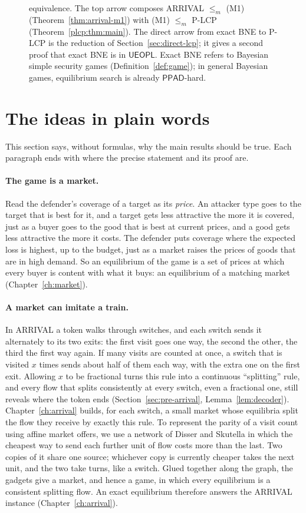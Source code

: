 \begin{figure}[t]
{equivalence. The top arrow composes ARRIVAL $\le_m$ (M1) (Theorem~\ref{thm:arrival-m1}) with (M1) $\le_m$ P-LCP (Theorem~\ref{plcp:thm:main}). The direct arrow from exact BNE to P-LCP is the reduction of Section~\ref{sec:direct-lcp}; it gives a second proof that exact BNE is in $\mathsf{UEOPL}$. Exact BNE refers to Bayesian simple security games (Definition~\ref{def:game}); in general Bayesian games, equilibrium search is already $\mathsf{PPAD}$-hard.}
\label{fig:landscape}
\end{figure}

\section{The ideas in plain words}\label{sec:intro-ideas}

This section says, without formulas, why the main results should be true. Each paragraph ends with
where the precise statement and its proof are.

\paragraph{The game is a market.} Read the defender's coverage of a target as its \emph{price}. An
attacker type goes to the target that is best for it, and a target gets less attractive the more it is
covered, just as a buyer goes to the good that is best at current prices, and a good gets less
attractive the more it costs. The defender puts coverage where the expected loss is highest, up to the
budget, just as a market raises the prices of goods that are in high demand. So an equilibrium of the
game is a set of prices at which every buyer is content with what it buys: an equilibrium of a matching
market (Chapter~\ref{ch:market}).

\paragraph{A market can imitate a train.} In ARRIVAL a token walks through switches, and each switch
sends it alternately to its two exits: the first visit goes one way, the second the other, the third the
first way again. If many visits are counted at once, a switch that is visited $x$ times sends about
half of them each way, with the extra one on the first exit. Allowing $x$ to be fractional turns this
rule into a continuous ``splitting'' rule, and every flow that splits consistently at every switch, even
a fractional one, still reveals where the token ends (Section~\ref{sec:pre-arrival},
Lemma~\ref{lem:decoder}). Chapter~\ref{ch:arrival} builds, for each switch, a small market whose
equilibria split the flow they receive by exactly this rule. To represent the parity of a visit
count using affine market offers, we use a network of Disser and Skutella in which
the cheapest way to send each further unit of flow costs more than the last. Two
copies of it share one source; whichever copy is currently cheaper takes the next unit, and the two
take turns, like a switch. Glued together along the graph, the gadgets give a market, and hence a game,
in which every equilibrium is a consistent splitting flow. An exact equilibrium therefore answers the
ARRIVAL instance (Chapter~\ref{ch:arrival}).

